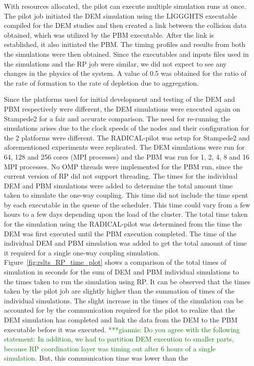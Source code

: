 \documentclass[preprint,11pt,authoryear]{elsarticle}
\newcommand{\gpnote}[1]{{\textcolor{green} {***giannis: #1}}}
\newcommand{\gpnote}[1]{}
\begin{document}
With resources allocated, the pilot can execute multiple simulation runs at once. The pilot job
initiated the DEM simulation using the LIGGGHTS executable compiled for the
DEM studies and then created a link between the collision data obtained, which
was utilized by the PBM executable. After the link is
established, it also initiated the PBM. The timing profiles and results from
both the simulations were then obtained. Since the executables and inputs files
used in the simulations and the RP job were similar, we did not expect to
see any changes in the physics of the system. A value of 0.5 was obtained for
the ratio of the rate of formation to the rate of depletion due to aggregation.

Since the platforms used for initial development and testing of the DEM and
PBM respectively were different, the DEM simulations were executed again on
Stampede2 for a fair and accurate comparison. The need for re-running the
simulations arises due to the clock speeds of the nodes and their
configuration for the 2 platforms were different. The RADICAL-pilot was setup
for Stampede2 and aforementioned experiments were replicated. The DEM
simulations were run for 64, 128 and 256 cores (MPI processes) and the PBM was
run for 1, 2, 4, 8 and 16 MPI processes. No OMP threads were implemented for
the PBM run, since the current version of RP did not support threading. The
times for the individual DEM and PBM simulations were added to determine the
total amount time taken to simulate the one-way coupling. This time did not
include the time spent by each executable in the queue of the scheduler. This
time could vary from a few hours to a few days depending upon the load of the
cluster. The total time taken for the simulation using the RADICAL-pilot was
determined from the time the DEM was first executed until the PBM execution
completed. The time of the individual DEM and PBM simulation was added to get
the total amount of time it required for a single one-way coupling simulation.
Figure~\ref{fig:rslts_RP_time_plot} shows a comparison of the total times of
simulation in seconds for the sum of DEM and PBM individual simulations to the
times taken to run the simulation using RP. It can be observed that the times
taken by the pilot job are slightly higher than the summation of times of the
individual simulations. The slight increase in the times of the simulation can
be accounted for by the communication required for the pilot to realize that the
DEM simulation has completed and link the data from the DEM to the PBM
executable before it was executed. \gpnote{Do you agree with the following statement:
In addition, we had to partition DEM execution to smaller parts, because RP coordination
layer was timing out after 6 hours of a single simulation.} But, this communication time was lower than the
\end{document}
